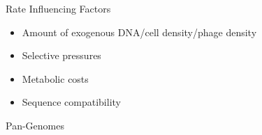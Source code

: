 \documentclass[dvipsnames]{beamer}
\begin{document}
\begin{frame}[fragile]{Rate Influencing Factors}
    \begin{itemize}
        \item Amount of exogenous DNA/cell density/phage density
        \item Selective pressures
        \item Metabolic costs
        \item Sequence compatibility
    \end{itemize}
\end{frame}
\begin{frame}[fragile]{Pan-Genomes}
    \begin{columns}
    \begin{column}{0.5\textwidth}
        \begin{figure}[htb!]
            \autocite{pang}
        \end{figure}
    \end{column}
    \begin{column}{0.5\textwidth}
        \begin{figure}[htb!]

\end{figure}
\end{column}
\end{columns}
\end{frame}
\end{document}
